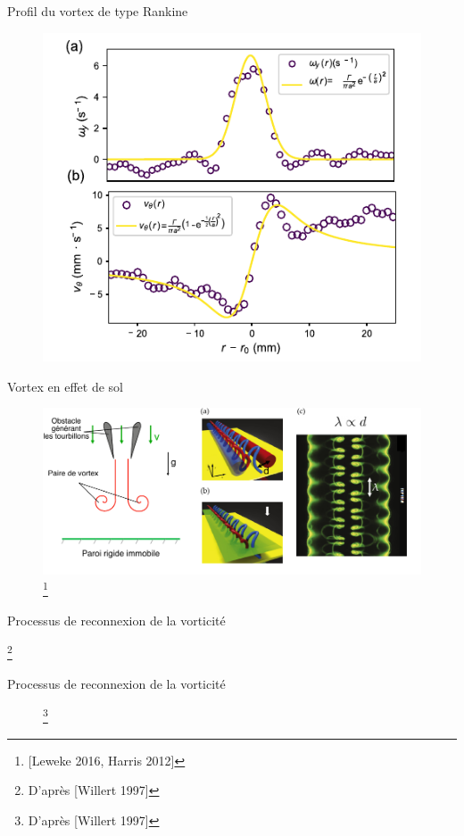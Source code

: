 \documentclass[aspectratio=169,10pt]{beamer}
\begin{document}
\begin{frame}{Profil du vortex de type Rankine}
  \begin{figure}
    \includegraphics[width=.5\textwidth]{Vorticityprofile_v2.pdf}
  \end{figure}
\end{frame}

\begin{frame}{Vortex en effet de sol}
  \vspace{-.5cm}
  \begin{figure}[t]
      \centering
      \includegraphics[scale=.9]{./figures/VortexInGroundEffect.pdf}\footnote{[Leweke 2016, Harris 2012]}
  \end{figure}
\end{frame}


\begin{frame}{Processus de reconnexion de la vorticité}
  \begin{figure}
      \resizebox{.9\textwidth}{!}{}
  \end{figure}\footnote{D'après [Willert 1997]}
\end{frame}

\begin{frame}{Processus de reconnexion de la vorticité}
  \begin{figure}[!ht]
      \centering
      \resizebox{.75\textwidth}{!}{}
     \footnote{D'après [Willert 1997]}
    \end{figure}
  \end{frame}
\end{document}
